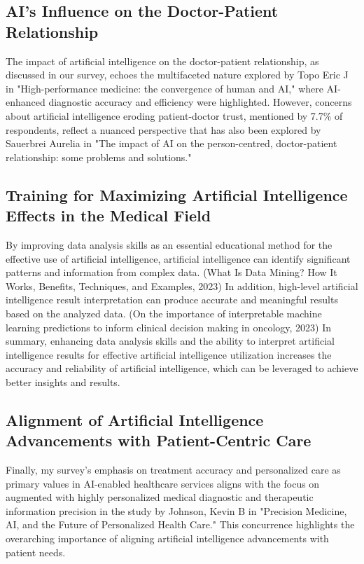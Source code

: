 \documentclass{ieeeaccess}
\begin{document}
\subsection{AI's Influence on the Doctor-Patient Relationship}
The impact of artificial intelligence on the doctor-patient relationship, as discussed in our survey, echoes the multifaceted nature explored by Topo Eric J in "High-performance medicine: the convergence of human and AI," where AI-enhanced diagnostic accuracy and efficiency were highlighted. However, concerns about artificial intelligence eroding patient-doctor trust, mentioned by 7.7\% of respondents, reflect a nuanced perspective that has also been explored by Sauerbrei Aurelia in "The impact of AI on the person-centred, doctor-patient relationship: some problems and solutions."

\subsection{Training for Maximizing Artificial Intelligence Effects in the Medical Field}
By improving data analysis skills as an essential educational method for the effective use of artificial intelligence, artificial intelligence can identify significant patterns and information from complex data. (What Is Data Mining? How It Works, Benefits, Techniques, and Examples, 2023) In addition, high-level artificial intelligence result interpretation can produce accurate and meaningful results based on the analyzed data. (On the importance of interpretable machine learning predictions to inform clinical decision making in oncology, 2023) In summary, enhancing data analysis skills and the ability to interpret artificial intelligence results for effective artificial intelligence utilization increases the accuracy and reliability of artificial intelligence, which can be leveraged to achieve better insights and results.

\subsection{Alignment of Artificial Intelligence Advancements with Patient-Centric Care}
Finally, my survey's emphasis on treatment accuracy and personalized care as primary values in AI-enabled healthcare services aligns with the focus on augmented with highly personalized medical diagnostic and therapeutic information precision in the study by Johnson, Kevin B in "Precision Medicine, AI, and the Future of Personalized Health Care." This concurrence highlights the overarching importance of aligning artificial intelligence advancements with patient needs.
\end{document}
